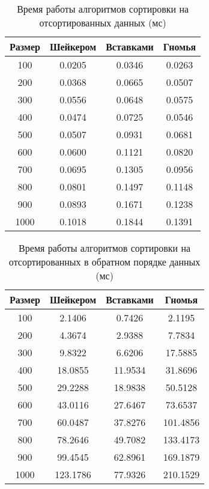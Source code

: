 \begin{table}[h]
	\begin{center}
		\caption{Время работы алгоритмов сортировки на отсортированных данных (мс)}
		\label{tbl:best}
		\begin{tabular}{|c|c|c|c|}
			\hline
			 Размер & Шейкером &  Вставками &  Гномья \\
			\hline
			100 & 0.0205 & 0.0346 & 0.0263 \\ 
			\hline
			 200 & 0.0368 & 0.0665 & 0.0507 \\ 
			\hline
			 300 & 0.0556 & 0.0648 & 0.0575 \\ 
			\hline
			 400 & 0.0474 & 0.0725 & 0.0546 \\ 
			\hline
			 500 & 0.0507 & 0.0931 & 0.0681 \\ 
			\hline
			 600 & 0.0600 & 0.1121 & 0.0820 \\ 
			\hline
			 700 & 0.0695 & 0.1305 & 0.0956 \\ 
			\hline
			 800 & 0.0801 & 0.1497 & 0.1148 \\ 
			\hline
			 900 & 0.0893 & 0.1671 & 0.1238 \\ 
			\hline
			1000 & 0.1018 & 0.1844 & 0.1391 \\ 
			\hline
		\end{tabular}
    \end{center}
\end{table}


\begin{table}[h]
	\begin{center}
		\caption{Время работы алгоритмов сортировки на отсортированных в обратном порядке данных (мс)}
		\label{tbl:worth}
		\begin{tabular}{|c|c|c|c|}
			\hline
			 Размер & Шейкером &  Вставками &  Гномья \\
			\hline
			100 & 2.1406 & 0.7426 & 2.1195 \\ 
			\hline
			200 & 4.3674 & 2.9388 & 7.7834 \\ 
			\hline
			300 & 9.8322 & 6.6206 & 17.5885 \\ 
			\hline
			400 & 18.0855 & 11.9534 & 31.8696 \\ 
			\hline
			500 & 29.2288 & 18.9838 & 50.5128 \\ 
			\hline
			600 & 43.0116 & 27.6467 & 73.6537 \\ 
			\hline
			700 & 60.0487 & 37.8276 & 101.4856 \\ 
			\hline
			800 & 78.2646 & 49.7082 & 133.4173 \\ 
			\hline
			900 & 99.4545 & 62.8961 & 169.1879 \\ 
			\hline
			1000 & 123.1786 & 77.9326 & 210.1529 \\ 
			\hline
		\end{tabular}
    \end{center}
\end{table}


